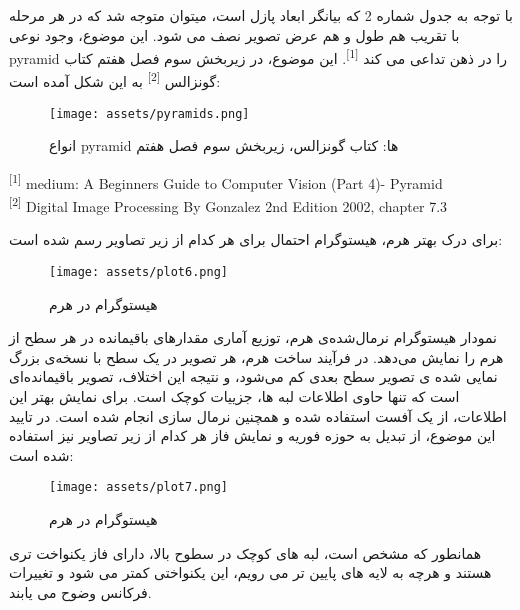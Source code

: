 \documentclass[a4paper,12pt]{article}
\begin{document}
با توجه به جدول شماره 2 که بیانگر ابعاد پازل است، میتوان متوجه شد که در هر مرحله با تقریب هم طول و هم عرض تصویر نصف می شود. این موضوع، وجود نوعی pyramid را در ذهن تداعی می کند \textsuperscript{[1]}.
 این موضوع، در زیربخش سوم فصل هفتم کتاب گونزالس
 \textsuperscript{[2]}
  به این شکل آمده است:

\begin{figure}[h]
	\centering
	\texttt{[image: assets/pyramids.png]}
	\caption{\textcolor{CustomAccent}{انواع pyramid ها: کتاب گونزالس، زیربخش سوم فصل هفتم}}
\end{figure}




\vfill
\hline
\begin{LTR}
	\begin{latin}
		\begin{center}
			\begin{minipage}{0.9\linewidth}
				\small %
				\textsuperscript{[1]} medium: A Beginners Guide to Computer Vision (Part 4)- Pyramid \\
				\textsuperscript{[2]} Digital Image Processing By Gonzalez 2nd Edition 2002, chapter 7.3
			\end{minipage}
		\end{center}
	\end{latin}
\end{LTR}
 

\pagebreak

برای درک بهتر هرم، هیستوگرام احتمال برای هر کدام از زیر تصاویر رسم شده است:


\begin{figure}[h]
	\centering
	\texttt{[image: assets/plot6.png]}
	\caption{\textcolor{CustomAccent}{هیستوگرام در هرم}}
\end{figure}

نمودار هیستوگرام نرمال‌شده‌ی هرم، توزیع آماری مقدارهای باقیمانده در هر سطح از هرم را نمایش می‌دهد. در فرآیند ساخت هرم، هر تصویر در یک سطح با نسخه‌ی بزرگ‌ نمایی ‌شده ‌ی تصویر سطح بعدی کم می‌شود، و نتیجه این اختلاف، تصویر باقیمانده‌ای است که تنها حاوی اطلاعات لبه‌ ها، جزییات کوچک است. برای نمایش بهتر این اطلاعات، از یک آفست استفاده شده و همچنین نرمال سازی انجام شده است. در تایید این موضوع، از تبدیل به حوزه فوریه و نمایش فاز هر کدام از زیر تصاویر نیز استفاده شده است:

\begin{figure}[h]
	\centering
	\texttt{[image: assets/plot7.png]}
	\caption{\textcolor{CustomAccent}{هیستوگرام در هرم}}
\end{figure}
 همانطور که مشخص است، لبه های کوچک در سطوح بالا، دارای فاز یکنواخت تری هستند و هرچه به لایه های پایین تر می رویم، این یکنواختی کمتر می شود و تغییرات فرکانس وضوح می یابند.
\end{document}
